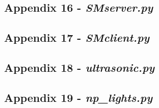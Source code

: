 

\newpage

\subsection{Appendix 16 - \textit{SMserver.py}}\label{A13}



\newpage

\subsection{Appendix 17 - \textit{SMclient.py}}\label{A13}



\newpage

\subsection{Appendix 18 - \textit{ultrasonic.py}}\label{A13}



\newpage

\subsection{Appendix 19 - \textit{np\_lights.py}}\label{A13}



 

